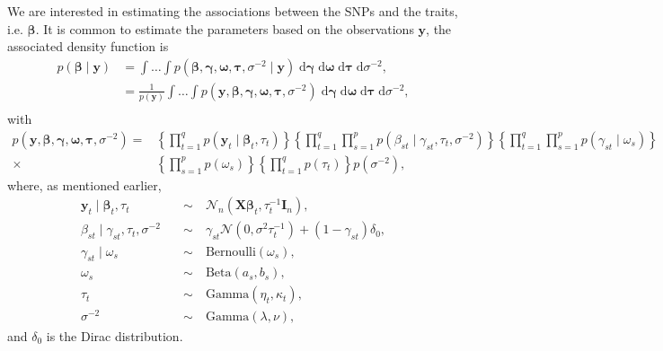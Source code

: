 \documentclass[a4paper, 11pt]{report}
\numberwithin{equation}{chapter}
\begin{document}
We are interested in estimating the associations between the SNPs and the traits, i.e. $\boldsymbol{\beta}$. It is common to estimate the parameters based on the observations $\boldsymbol{y}$, the associated density function is
\begin{align*}
p(\boldsymbol{\beta}\mid\boldsymbol{y})&=\int\dots\int p(\boldsymbol{\beta},\boldsymbol{\gamma},\boldsymbol{\omega},\boldsymbol{\tau},\sigma^{-2}\mid\boldsymbol{y})\;\mathrm{d}\boldsymbol{\gamma}\;\mathrm{d}\boldsymbol{\omega}\;\mathrm{d}\boldsymbol{\tau}\;\mathrm{d}\sigma^{-2},\\
&=\frac{1}{p(\boldsymbol{y})}\int\dots\int p(\boldsymbol{y},\boldsymbol{\beta},\boldsymbol{\gamma},\boldsymbol{\omega},\boldsymbol{\tau},\sigma^{-2})\;\mathrm{d}\boldsymbol{\gamma}\;\mathrm{d}\boldsymbol{\omega}\;\mathrm{d}\boldsymbol{\tau}\;\mathrm{d}\sigma^{-2},\\
\end{align*}
with 
\begin{align*}
p(\boldsymbol{y},\boldsymbol{\beta},\boldsymbol{\gamma},\boldsymbol{\omega},\boldsymbol{\tau},\sigma^{-2}) = &\left\lbrace\prod_{t=1}^qp(\boldsymbol{y}_t \mid \boldsymbol{\beta}_t,\tau_t)\right\rbrace\left\lbrace\prod_{t=1}^q\prod_{s=1}^p p(\beta_{st} \mid \gamma_{st},\tau_t,\sigma^{-2})\right\rbrace\left\lbrace \prod_{t=1}^q\prod_{s=1}^p p(\gamma_{st} \mid \omega_s)\right\rbrace\\
\times &\left\lbrace \prod_{s=1}^p p(\omega_s)\right\rbrace\left\lbrace\prod_{t=1}^q p(\tau_t)\right\rbrace p(\sigma^{-2}),
\end{align*}
where, as mentioned earlier,
\begin{align*}
\boldsymbol{y}_t \mid \boldsymbol{\beta}_t,\tau_t \quad &\sim \quad \mathcal{N}_n\left(\boldsymbol{X}\boldsymbol{\beta}_t,\tau_t^{-1}\boldsymbol{I}_n\right),\\
\beta_{st} \mid \gamma_{st},\tau_t,\sigma^{-2} \quad &\sim \quad \gamma_{st}\mathcal{N}\left(0,\sigma^2\tau_t^{-1}\right)+(1-\gamma_{st})\delta_0,\\
\gamma_{st} \mid \omega_s \quad &\sim \quad \mathrm{Bernoulli}(\omega_s),\\
\omega_s \quad &\sim \quad \mathrm{Beta}(a_s,b_s),\\
\tau_t \quad &\sim \quad \mathrm{Gamma}(\eta_t,\kappa_t),\\
\sigma^{-2} \quad &\sim \quad \mathrm{Gamma}(\lambda, \nu),
\end{align*}
and $\delta_0$ is the Dirac distribution.
\newpage
\end{document}
